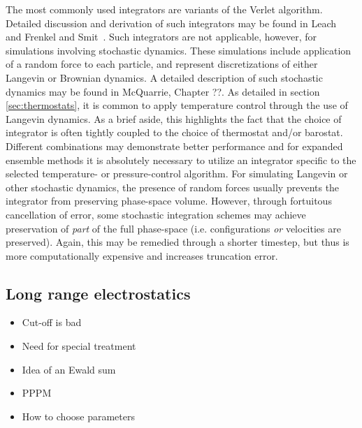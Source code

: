 \documentclass[9pt,bestpractices]{livecoms}
\begin{document}
The most commonly used integrators are variants of the Verlet algorithm. 
Detailed discussion and derivation of such integrators may be found in Leach~\cite{2001Leach} and Frenkel and Smit~\cite{Frenkel:2001:}.
Such integrators are not applicable, however, for simulations involving stochastic dynamics.
These simulations include application of a random force to each particle, and represent discretizations of either Langevin or Brownian dynamics.
A detailed description of such stochastic dynamics may be found in McQuarrie, Chapter ??.
As detailed in section \ref{sec:thermostats}, it is common to apply temperature control through the use of Langevin dynamics.
As a brief aside, this highlights the fact that the choice of integrator is often tightly coupled to the choice of thermostat and/or barostat.
Different combinations may demonstrate better performance and for expanded ensemble methods it is absolutely necessary to utilize an integrator specific to the selected temperature- or pressure-control algorithm.
For simulating Langevin or other stochastic dynamics, the presence of random forces usually prevents the integrator from preserving phase-space volume.
However, through fortuitous cancellation of error, some stochastic integration schemes may achieve preservation of \textit{part} of the full phase-space (i.e. configurations \textit{or} velocities are preserved).
Again, this may be remedied through a shorter timestep, but thus is more computationally expensive and increases truncation error.



\subsection{Long range electrostatics}
\label{sec:lr_electrostatics}
\begin{itemize}
\item Cut-off is bad
\item Need for special treatment
\item Idea of an Ewald sum
\item PPPM
\item How to choose parameters
\end{itemize}
\end{document}
